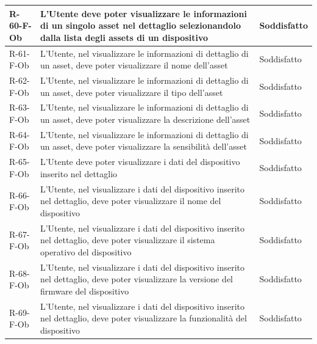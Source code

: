 \documentclass[a4paper,12pt]{article}
\begin{document}
{{\begin{longtable}{|l|p{}|p{}|}
                R-60-F-Ob       & L'Utente deve poter visualizzare le informazioni di un singolo asset nel dettaglio selezionandolo dalla lista degli assets di un dispositivo                                                & Soddisfatto \\ \hline
                R-61-F-Ob       & L'Utente, nel visualizzare le informazioni di dettaglio di un asset, deve poter visualizzare il nome dell'asset                                                                             & Soddisfatto \\ \hline
                R-62-F-Ob       & L'Utente, nel visualizzare le informazioni di dettaglio di un asset, deve poter visualizzare il tipo dell'asset                                                                             & Soddisfatto \\ \hline
                R-63-F-Ob       & L'Utente, nel visualizzare le informazioni di dettaglio di un asset, deve poter visualizzare la descrizione dell'asset                                                                      & Soddisfatto \\ \hline
                R-64-F-Ob       & L'Utente, nel visualizzare le informazioni di dettaglio di un asset, deve poter visualizzare la sensibilità dell'asset                                                                      & Soddisfatto \\ \hline
                R-65-F-Ob       & L'Utente deve poter visualizzare i dati del dispositivo inserito nel dettaglio                                                                                                              & Soddisfatto \\ \hline
                R-66-F-Ob       & L'Utente, nel visualizzare i dati del dispositivo inserito nel dettaglio, deve poter visualizzare il nome del dispositivo                                                                   & Soddisfatto \\ \hline
                R-67-F-Ob       & L'Utente, nel visualizzare i dati del dispositivo inserito nel dettaglio, deve poter visualizzare il sistema operativo del dispositivo                                                      & Soddisfatto \\ \hline
                R-68-F-Ob       & L'Utente, nel visualizzare i dati del dispositivo inserito nel dettaglio, deve poter visualizzare la versione del firmware del dispositivo                                                  & Soddisfatto \\ \hline
                R-69-F-Ob       & L'Utente, nel visualizzare i dati del dispositivo inserito nel dettaglio, deve poter visualizzare la funzionalità del dispositivo                                                           & Soddisfatto \\ \hline

\end{longtable}}}
\end{document}
